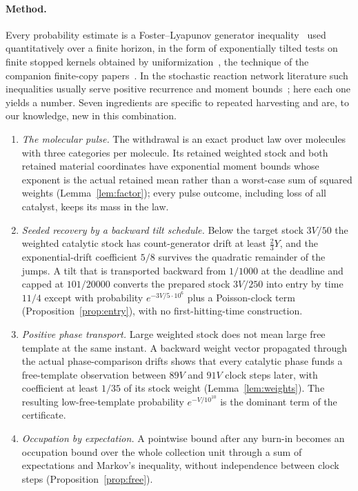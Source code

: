 \documentclass[11pt,a4paper]{article}
\theoremstyle{plain}
\theoremstyle{definition}
\theoremstyle{remark}
\begin{document}
\paragraph{Method.}
Every probability estimate is a Foster--Lyapunov generator inequality~\citep{meyn1993} used quantitatively over a finite horizon, in the form of exponentially tilted tests on finite stopped kernels obtained by uniformization~\citep{jensen1953,grassmann1977}, the technique of the companion finite-copy papers~\citep{finitecopy2026,exporter2026}. In the stochastic reaction network literature such inequalities usually serve positive recurrence and moment bounds~\citep{gupta2014,anderson2018}; here each one yields a number. Seven ingredients are specific to repeated harvesting and are, to our knowledge, new in this combination.
\begin{enumerate}[label=(\roman*)]
\item \emph{The molecular pulse.} The withdrawal is an exact product law over molecules with three categories per molecule. Its retained weighted stock and both retained material coordinates have exponential moment bounds whose exponent is the actual retained mean rather than a worst-case sum of squared weights (Lemma~\ref{lem:factor}); every pulse outcome, including loss of all catalyst, keeps its mass in the law.
\item \emph{Seeded recovery by a backward tilt schedule.} Below the target stock $3V/50$ the weighted catalytic stock has count-generator drift at least $\tfrac23Y$, and the exponential-drift coefficient $5/8$ survives the quadratic remainder of the jumps. A tilt that is transported backward from $1/1000$ at the deadline and capped at $101/20000$ converts the prepared stock $3V/250$ into entry by time $11/4$ except with probability $e^{-3V/5\cdot10^6}$ plus a Poisson-clock term (Proposition~\ref{prop:entry}), with no first-hitting-time construction.
\item \emph{Positive phase transport.} Large weighted stock does not mean large free template at the same instant. A backward weight vector propagated through the actual phase-comparison drifts shows that every catalytic phase funds a free-template observation between $89V$ and $91V$ clock steps later, with coefficient at least $1/35$ of its stock weight (Lemma~\ref{lem:weights}). The resulting low-free-template probability $e^{-V/10^{10}}$ is the dominant term of the certificate.
\item \emph{Occupation by expectation.} A pointwise bound after any burn-in becomes an occupation bound over the whole collection unit through a sum of expectations and Markov's inequality, without independence between clock steps (Proposition~\ref{prop:free}).

\end{enumerate}
\end{document}
